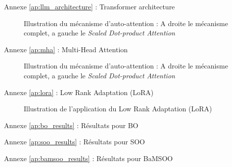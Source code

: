 \begin{frame}{Annexe \ref{ap:llm_architecture} : Transformer architecture}
    \label{ap:llm_architecture}
    \begin{figure}
        \centering
        
        \caption{Illustration du mécanisme d'auto-attention : A droite le mécanisme complet, a gauche le \textit{Scaled Dot-product Attention}}
    \end{figure}
    
\end{frame}

\begin{frame}{Annexe \ref{ap:mha} : Multi-Head Attention}
    \label{ap:mha}
    \begin{figure}
        \centering
        
        \caption{Illustration du mécanisme d'auto-attention : A droite le mécanisme complet, a gauche le \textit{Scaled Dot-product Attention}}
    \end{figure}
    
\end{frame}

\begin{frame}{Annexe \ref{ap:lora} : Low Rank Adaptation (LoRA)}
    \label{ap:lora}
    \begin{figure}
        \centering
        
        \caption{Illustration de l'application du Low Rank Adaptation (LoRA)}
    \end{figure}
    
\end{frame}


\begin{frame}{Annexe \ref{ap:bo_results} : Résultats pour BO}
    \label{ap:bo_results}
    
\end{frame}

\begin{frame}{Annexe \ref{ap:soo_results} : Résultats pour SOO}
    \label{ap:soo_results}
    
\end{frame}

\begin{frame}{Annexe \ref{ap:bamsoo_results} : Résultats pour BaMSOO}
    \label{ap:bamsoo_results}
    
\end{frame}